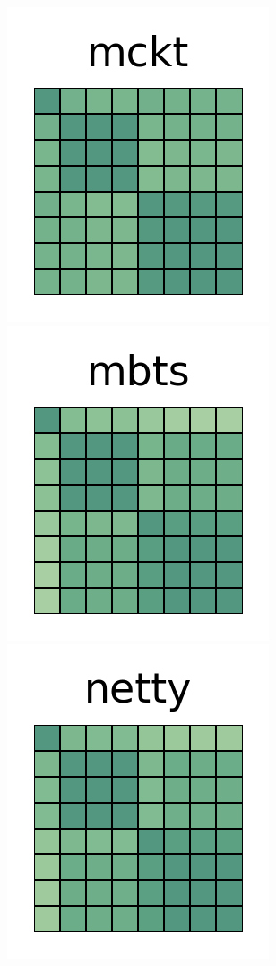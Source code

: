 \documentclass[10pt,conference]{IEEEtran}
\begin{document}
\begin{figure}[htb!]
 \includegraphics[width=\heatmapWidth, keepaspectratio]{entropy-correlations/mockito-grids.png}
 \includegraphics[width=\heatmapWidth, keepaspectratio]{entropy-correlations/mybatis-3-grids.png}
 \includegraphics[width=\heatmapWidth, keepaspectratio]{entropy-correlations/netty-grids.png}

\end{figure}
\end{document}
